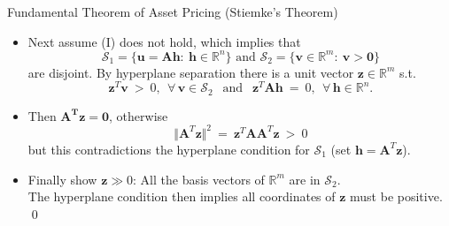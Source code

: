\documentclass[aspectratio=1610]{beamer}
\newcommand{\st}{s.t.\ }
\newcommand{\eq}{\ =\ }
\newcommand{\andsp}{\text{ \ \ and \ \ }}
\newcommand{\bb}{\mathbb}
\newcommand{\mc}{\mathcal}
\begin{document}
\begin{frame}{Fundamental Theorem of Asset Pricing (Stiemke's Theorem)}
\begin{itemize}
  \item Next assume (I) does not hold, which implies that
  \begin{equation}
    \mc S_1 = \{\bm u = \bm{Ah}: \ \bm h \in \bb R^n\}
    \andsp
    \mc S_2 = \{\bm v\in \bb R^m: \ \bm v > \bm 0\}
  \end{equation}
  are disjoint. By hyperplane separation there is a unit vector $\bm z \in \bb R^m$ \st
  \begin{equation}
    \bm z^T\bm v \ > \ 0, \ \ \forall\, \bm v \in \mc S_2
    \ \ \andsp \ \
    \bm z^T\bm{Ah} \eq 0, \ \ \forall\, \bm h\in \bb R^n.
  \end{equation}
  \item Then $\bm{A^Tz}=\bm 0$, otherwise
  \begin{equation}
    \Vert\bm A^T \bm z\Vert^2 \eq \bm z^T\bm{AA}^T\bm z \ > \ 0
  \end{equation}
  but this contradictions the hyperplane condition for $\mc S_1$ (set $\bm h = \bm A^T\bm z$).
  \item Finally show $\bm z \gg 0$: All the basis vectors of $\bb R^m$ are in $\mc S_2$.
  \\ The hyperplane condition then implies all coordinates of $\bm z$ must be positive. \qed
\end{itemize}
\end{frame}
\end{document}
